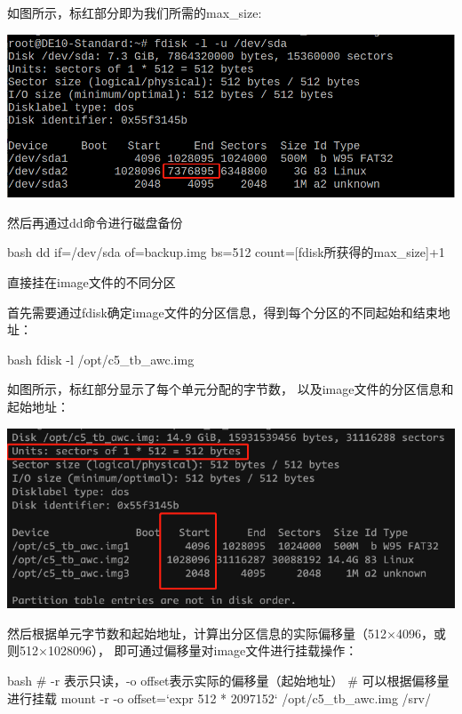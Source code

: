 \begin{outline}[enumerate]
如图所示，标红部分即为我们所需的max\_size:
\par\begin{minipage}{\linewidth}
  \centering
  \includegraphics[width=\linewidth]{backup.png}
  \label{fig:backup}
\end{minipage}

然后再通过dd命令进行磁盘备份
\begin{code-block}{bash}
dd if=/dev/sda of=backup.img bs=512 count=[fdisk所获得的max_size]+1
\end{code-block}

\1 直接挂在image文件的不同分区

首先需要通过fdisk确定image文件的分区信息，得到每个分区的不同起始和结束地址：
\begin{code-block}{bash}
fdisk -l /opt/c5_tb_awc.img
\end{code-block}

如图所示，标红部分显示了每个单元分配的字节数，
以及image文件的分区信息和起始地址：
\par\begin{minipage}{\linewidth}
  \centering
  \includegraphics[width=\linewidth]{imagefile.png}
  \label{fig:imagefile}
\end{minipage}

然后根据单元字节数和起始地址，计算出分区信息的实际偏移量（512×4096，或则512×1028096），
即可通过偏移量对image文件进行挂载操作：
\begin{code-block}{bash}
# -r 表示只读，-o offset表示实际的偏移量（起始地址）
# 可以根据偏移量进行挂载
mount -r -o offset=`expr 512 * 2097152` /opt/c5_tb_awc.img /srv/
\end{code-block}


\end{outline}
